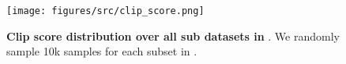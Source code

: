 \begin{figure}[t]
    \centering
    \texttt{[image: figures/src/clip\_score.png]}
    \caption{
    \textbf{Clip score distribution over all sub datasets in \DatasetName}.
    We randomly sample 10k samples for each subset in \DatasetName.
    }
    \label{fig:clip score subdataset}
\end{figure}